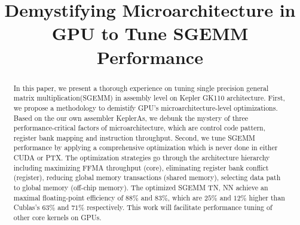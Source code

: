 \documentclass{sig-alternate-05-2015}
\begin{document}






\title{Demystifying Microarchitecture in GPU to Tune SGEMM Performance}
\subtitle{}


\maketitle

\begin{abstract}
In this paper, we present a thorough experience on tuning single precision general matrix multiplication(SGEMM)
in assembly level on Kepler GK110 architecture. First, we propose a methodology to demistify GPU's
microarchitecture-level optimizations. Based on the our own assembler KeplerAs, we debunk the
mystery of three performance-critical factors of microarchitecture,
which are control code pattern, register bank mapping and instruction throughput. Second, we tune
SGEMM performance by applying a comprehensive optimization which is never done in either CUDA or
PTX. The optimization strategies go through the architecture hierarchy including maximizing FFMA
throughput (core), eliminating register bank conflict (register), reducing global memory
transactions (shared memory), selecting data path to global memory (off-chip memory).
The optimized SGEMM TN, NN achieve an maximal floating-point efficiency of $88\%$ and $83\%$, which are $25\%$ and
$12\%$ higher than Cublas's $63\%$ and $71\%$ respectively.
This work will facilitate performance tuning of other core kernels on GPUs.
\end{abstract}


\end{document}
